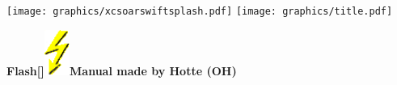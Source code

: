 \documentclass[german,a4paper,twoside]{scrreprt}
\def\bbblitz{\includegraphics[height=4.0em]{Bilder/blitz1.png}}
\begin{document}
\vspace*{2cm}

\begin{center}
  \texttt{[image: graphics/xcsoarswiftsplash.pdf]}
  \vskip 0.5cm
  \texttt{[image: graphics/title.pdf]}
\end{center}

\vspace*{2cm}

\begin{center}
{\Large\textbf{\textsf{Flash\raisebox{-\baselineskip}[\ht\strutbox]{\bbblitz}Manual made by Hotte (OH)}}}\\
\end{center}

\tableofcontents
\printindex
\end{document}
